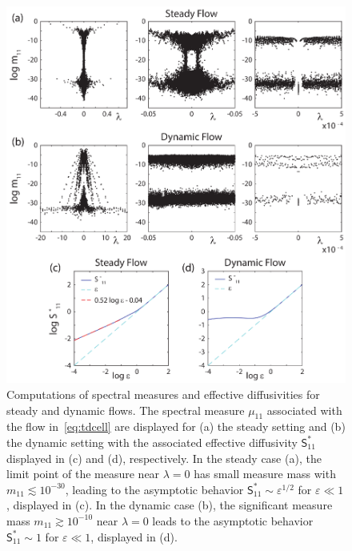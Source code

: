 \documentclass[leqno,onefignum,onetabnum]{siamltex1213}
\newcommand{\Sm}{\mathsf{S}}
\begin{document}
%
\begin{figure}[t]
  \centerline{\includegraphics[scale=0.75]{Figure1_Spectral_Measures_Effective_Diffusivities.eps}} 
\caption{%
  Computations of spectral measures and effective diffusivities for
  steady and dynamic flows. The spectral measure $\mu_{11}$ associated
  with the flow in~\eqref{eq:tdcell} are displayed for (a) the steady
  setting and (b) the dynamic setting with the associated effective
  diffusivity $\Sm^*_{11}$ displayed in (c) and (d), respectively. In
  the steady case (a), the 
  limit point of the measure near $\lambda=0$ has small measure mass with
  $m_{11}\lesssim10^{-30}$, leading to the asymptotic behavior
  $\Sm^*_{11}\sim\varepsilon^{1/2}$ for $\varepsilon\ll1$, displayed in (c). In the dynamic case
  (b), the significant measure mass $m_{11}\gtrsim10^{-10}$
  near $\lambda=0$ leads to the asymptotic behavior
  $\Sm^*_{11}\sim1$ for $\varepsilon\ll1$, displayed in (d).
        }
\label{fig:Fig1_Spect_Meas_Eff_Diffus}
\end{figure}
%
\end{document}
